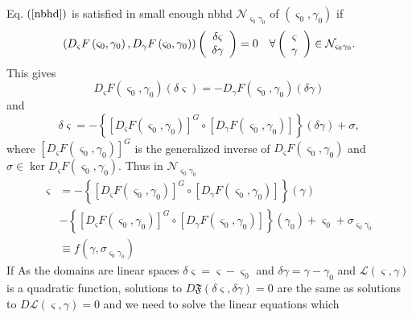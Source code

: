 \documentclass[aps,preprint]{revtex4}%
\begin{document}
Eq. $\left(  \ref{nbhd}\right)  $ is satisfied in small enough nbhd
$\mathcal{N}_{\varsigma_{0}\gamma_{0}}$ of $\left(  \varsigma_{0},\gamma
_{0}\right)  $ if
\begin{equation}
\left(  D_{\varsigma}F\left(  \varsigma_{0},\gamma_{0}\right)  ,D_{\gamma
}F\left(  \varsigma_{0},\gamma_{0}\right)  \right)  \left(
\begin{array}
[c]{c}%
\delta\varsigma\\
\delta\gamma
\end{array}
\right)  =0\quad\forall\left(
\begin{array}
[c]{c}%
\varsigma\\
\gamma
\end{array}
\right)  \in\mathcal{N}_{\varsigma_{0}\gamma_{0}}.
\end{equation}
This gives
\begin{equation}
D_{\varsigma}F\left(  \varsigma_{0},\gamma_{0}\right)  \left(  \delta
\varsigma\right)  =-D_{\gamma}F\left(  \varsigma_{0},\gamma_{0}\right)
\left(  \delta\gamma\right)
\end{equation}
and
\begin{equation}
\delta\varsigma=-\left\{  \left[  D_{\varsigma}F\left(  \varsigma_{0}%
,\gamma_{0}\right)  \right]  ^{G}\circ\left[  D_{\gamma}F\left(  \varsigma
_{0},\gamma_{0}\right)  \right]  \right\}  \left(  \delta\gamma\right)
+\sigma,
\end{equation}
where $\left[  D_{\varsigma}F\left(  \varsigma_{0},\gamma_{0}\right)  \right]
^{G}$ is the generalized inverse of $D_{\varsigma}F\left(  \varsigma
_{0},\gamma_{0}\right)  $ and $\sigma\in\ker D_{\varsigma}F\left(
\varsigma_{0},\gamma_{0}\right)  .$ Thus in $\mathcal{N}_{\varsigma_{0}%
\gamma_{0}}$
\begin{align}
\varsigma &  =-\left\{  \left[  D_{\varsigma}F\left(  \varsigma_{0},\gamma
_{0}\right)  \right]  ^{G}\circ\left[  D_{\gamma}F\left(  \varsigma_{0}%
,\gamma_{0}\right)  \right]  \right\}  \left(  \gamma\right) \\
&  -\left\{  \left[  D_{\varsigma}F\left(  \varsigma_{0},\gamma_{0}\right)
\right]  ^{G}\circ\left[  D_{\gamma}F\left(  \varsigma_{0},\gamma_{0}\right)
\right]  \right\}  \left(  \gamma_{0}\right)  +\varsigma_{0}+\sigma
_{\varsigma_{0}\gamma_{0}}\\
&  \equiv f\left(  \gamma,\sigma_{\varsigma_{0}\gamma_{0}}\right)
\end{align}
If As the domains are linear spaces $\delta\varsigma=\varsigma-\varsigma_{0}$
and $\delta\gamma=\gamma-\gamma_{0}$ and $\mathcal{L}\left(  \varsigma
,\gamma\right)  $ is a quadratic function, solutions to $D\mathfrak{F}\left(
\delta\varsigma,\delta\gamma\right)  =0$ are the same as solutions to
$D\mathcal{L}\left(  \varsigma,\gamma\right)  =0$ and we need to solve the
linear equations which
\end{document}
